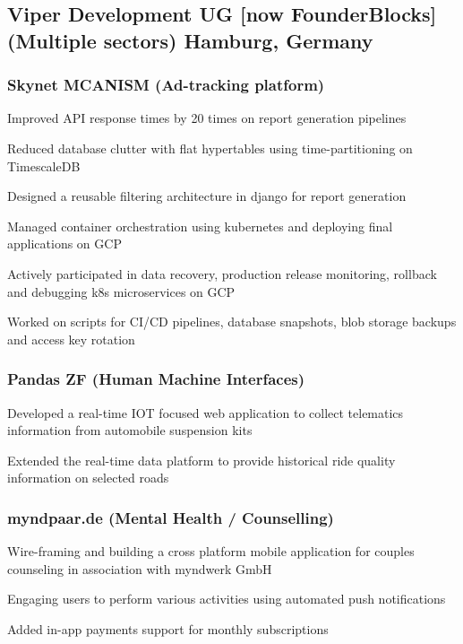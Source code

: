 \documentclass[letter,10pt]{article}
\begin{document}

\subsection{Viper Development UG [now FounderBlocks] (Multiple sectors) \hfill Hamburg, Germany}

\vspace{1em}
\subsubsection*{Skynet MCANISM (Ad-tracking platform)}
\begin{zitemize}
\item Improved API response times by 20 times on report generation pipelines
\item Reduced database clutter with flat hypertables using time-partitioning on TimescaleDB
\item Designed a reusable filtering architecture in django for report generation
\item Managed container orchestration using kubernetes and deploying final applications on GCP
\item Actively participated in data recovery, production release monitoring, rollback and debugging k8s microservices on GCP
\item Worked on scripts for CI/CD pipelines, database snapshots, blob storage backups and access key rotation
\end{zitemize}

\subsubsection*{Pandas ZF (Human Machine Interfaces)}
\begin{zitemize}
\item Developed a real-time IOT focused web application to collect telematics information from automobile suspension kits
\item Extended the real-time data platform to provide historical ride quality information on selected roads
\end{zitemize}

\subsubsection*{myndpaar.de (Mental Health / Counselling)}
\begin{zitemize}
\item Wire-framing and building a cross platform mobile application for couples counseling in association with myndwerk GmbH
\item Engaging users to perform various activities using automated push notifications
\item Added in-app payments support for monthly subscriptions
\end{zitemize}
\end{document}
